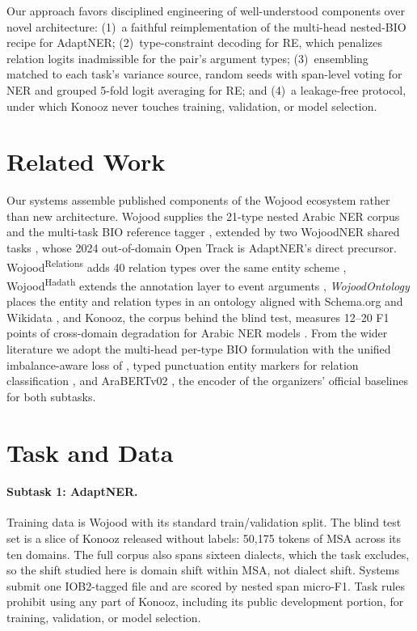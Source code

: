 \documentclass[11pt]{article}
\newcommand{\WojoodRel}{Wojood\textsuperscript{Relations}}
\newcommand{\WojoodHad}{Wojood\textsuperscript{Hadath}}
\begin{document}
Our approach favors disciplined engineering of well-understood components
over novel architecture: (1)~a faithful reimplementation of the multi-head
nested-BIO recipe for AdaptNER; (2)~type-constraint decoding for RE, which
penalizes relation logits inadmissible for the pair's argument types;
(3)~ensembling matched to each task's variance source,
random seeds with span-level voting for NER and grouped 5-fold logit
averaging for RE; and (4)~a leakage-free protocol, under which Konooz never
touches training, validation, or model selection.

\section{Related Work}

Our systems assemble published components of the Wojood ecosystem rather
than new architecture. Wojood supplies the 21-type nested Arabic NER
corpus and the
multi-task BIO reference tagger \citep{jarrar-etal-2022-wojood}, extended
by two WojoodNER shared tasks \citep{jarrar-etal-2023-wojoodner,
jarrar-etal-2024-wojoodner}, whose 2024 out-of-domain Open Track is
AdaptNER's direct precursor. \WojoodRel{} adds 40 relation types over
the same entity scheme \citep{aljabari-etal-2025-wojoodrelations},
\WojoodHad{} extends the annotation layer to event arguments
\citep{aljabari-etal-2024-event}, \textit{WojoodOntology} places the
entity and relation types in an ontology aligned with Schema.org and
Wikidata \citep{aljabari-etal-2025-wojoodontology}, and Konooz, the corpus behind the blind
test, measures 12--20 F1 points of cross-domain degradation for Arabic
NER models \citep{hamad-etal-2025-konooz}. From the wider literature we
adopt the multi-head per-type BIO
formulation with the unified imbalance-aware loss of
\citet{mahdaouy-etal-2023-um6p}, typed punctuation entity markers for
relation classification \citep{zhou-chen-2022-improved}, and AraBERTv02
\citep{antoun-etal-2020-arabert}, the encoder of the organizers' official
baselines for both subtasks.

\section{Task and Data}

\paragraph{Subtask 1: AdaptNER.} Training data is Wojood with its
standard train/validation split. The blind test set is a slice of Konooz
released without labels: 50,175 tokens of MSA across its ten
domains. The full corpus also spans sixteen dialects, which the task
excludes, so the shift studied here is domain shift within MSA, not
dialect shift. Systems
submit one IOB2-tagged file and are scored by nested span micro-F1. Task
rules prohibit using any part of Konooz, including its public
development portion, for training, validation, or model selection.
\end{document}
